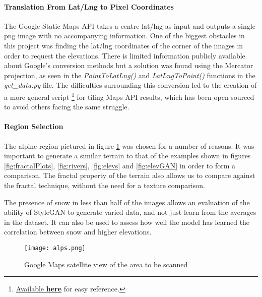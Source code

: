 \documentclass[a4paper]{report}
\begin{document}
\paragraph{Translation From Lat/Lng to Pixel Coordinates}
The Google Static Maps API takes a centre lat/lng as input and outputs a single png image with no accompanying information. One of the biggest obstacles in this project was finding the lat/lng coordinates of the corner of the images in order to request the elevations. There is limited information publicly available about Google's conversion methods but a solution was found using the Mercator projection, as seen in the \textit{PointToLatLng()} and \textit{LatLngToPoint()} functions in the \textit{get\_data.py} file.
The difficulties surrounding this conversion led to the creation of a more general script \cite{tiles}\footnote{\href{https://github.com/hulleylm/google_maps_tiler}{Available \textbf{here}} for easy reference.} for tiling Maps API results, which has been open sourced to avoid others facing the same struggle.

\paragraph{Region Selection}
The alpine region pictured in figure \ref{fig:alps} was chosen for a number of reasons. It was important to generate a similar terrain to that of the examples shown in figures \ref{fig:fractalPlots}, \ref{fig:rivers}, \ref{fig:elevs} and \ref{fig:elevGAN} in order to form a comparison. The fractal property of the terrain also allows us to compare against the fractal technique, without the need for a texture comparison.

The presence of snow in less than half of the images allows an evaluation of the ability of StyleGAN to generate varied data, and not just learn from the averages in the dataset. It can also be used to assess how well the model has learned the correlation between snow and higher elevations.

\begin{figure}[H]
    \centering
        \texttt{[image: alps.png]}
        \caption{Google Maps satellite view of the area to be scanned}
        \label{fig:alps}
\end{figure}
\end{document}
